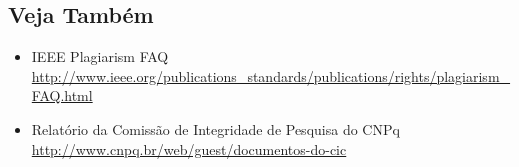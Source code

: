\subsection{Veja Também}
\begin{itemize}
	\item IEEE Plagiarism FAQ
		\\\url{http://www.ieee.org/publications_standards/publications/rights/plagiarism_FAQ.html}
	\item Relatório da Comissão de Integridade de Pesquisa do CNPq
		\\\url{http://www.cnpq.br/web/guest/documentos-do-cic}
\end{itemize}

\fi


